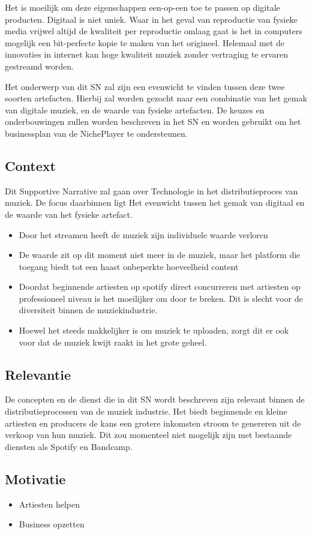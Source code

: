 Het is moeilijk om deze eigenschappen een-op-een toe te passen op digitale producten. Digitaal is niet uniek. Waar in het geval van reproductie van fysieke media vrijwel altijd de kwaliteit per reproductie omlaag gaat is het in computers mogelijk een bit-perfecte kopie te maken van het origineel. Helemaal met de innovaties in internet kan hoge kwaliteit muziek zonder vertraging te ervaren gestreamd worden.

Het onderwerp van dit SN zal zijn een evenwicht te vinden tussen deze twee soorten artefacten. Hierbij zal worden gezocht naar een combinatie van het gemak van digitale muziek, en de waarde van fysieke artefacten. De keuzes en onderbouwingen zullen worden beschreven in het SN en worden gebruikt om het businessplan van de NichePlayer te ondersteunen.

\subsection{Context}
Dit Supportive Narrative zal gaan over Technologie in het distributieproces van muziek. De focus daarbinnen ligt Het evenwicht tussen het gemak van digitaal en de waarde van het fysieke artefact.

\begin{itemize}
    \item Door het streamen heeft de muziek zijn individuele waarde verloren
    \item De waarde zit op dit moment niet meer in de muziek, maar het platform die toegang biedt tot een haast onbeperkte hoeveelheid content
    \item Doordat beginnende artiesten op spotify direct concurreren met artiesten op professioneel niveau is het moeilijker om door te breken. Dit is slecht voor de diversiteit binnen de muziekindustrie.
    \item Hoewel het steeds makkelijker is om muziek te uploaden, zorgt dit er ook voor dat de muziek kwijt raakt in het grote geheel.    
\end{itemize}

\subsection{Relevantie}
De concepten en de dienst die in dit SN wordt beschreven zijn relevant binnen de distributieprocessen van de muziek industrie. Het biedt beginnende en kleine artiesten en producers de kans een grotere inkomsten stroom te genereren uit de verkoop van hun muziek. Dit zou momenteel niet mogelijk zijn met bestaande diensten als Spotify en Bandcamp.

\subsection{Motivatie}
\begin{itemize}
    \item Artiesten helpen
    \item Business opzetten
\end{itemize}
